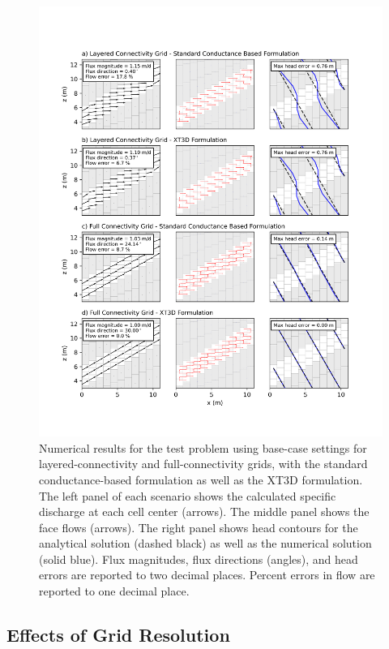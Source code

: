 \documentclass{article}
\begin{document}
\begin{figure}[p!]
	\begin{center}
	\includegraphics[scale=0.75]{../figures/fig2_paper.png}
	\caption{Numerical results for the test problem using base-case settings for layered-connectivity and full-connectivity grids, with the standard conductance-based formulation as well as the XT3D formulation. The left panel of each scenario shows the calculated specific discharge at each cell center (arrows). The middle panel shows the face flows (arrows). The right panel shows head contours for the analytical solution ({\color{red}dashed} black) as well as the numerical solution ({\color{red}solid} blue). {\color{red} Flux magnitudes, flux directions (angles), and head errors are reported to two decimal places. Percent errors in flow are reported to one decimal place.}}
	\label{fig:fig2}
	\end{center}
\end{figure}

\subsection*{Effects of Grid Resolution}
\end{document}

